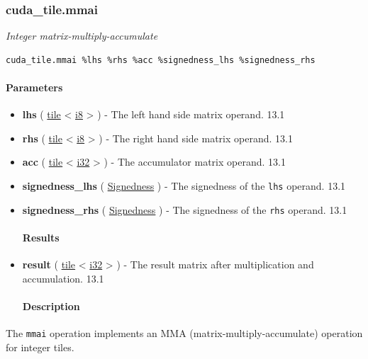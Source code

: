 \documentclass{article}
\begin{document}
\subsubsection{cuda\_tile.mmai}

\textit{Integer matrix-multiply-accumulate}


\begin{lstlisting}
cuda_tile.mmai %lhs %rhs %acc %signedness_lhs %signedness_rhs
\end{lstlisting}

\paragraph{Parameters}

\begin{itemize}
\item \textbf{lhs} ( \href{https://docs.nvidia.com/cuda/tile-ir/latest/sections/types.html#type-tile}{tile} < \href{https://docs.nvidia.com/cuda/tile-ir/latest/sections/types.html#subsection-element-types}{i8} > ) - The left hand side matrix operand. 13.1
\item \textbf{rhs} ( \href{https://docs.nvidia.com/cuda/tile-ir/latest/sections/types.html#type-tile}{tile} < \href{https://docs.nvidia.com/cuda/tile-ir/latest/sections/types.html#subsection-element-types}{i8} > ) - The right hand side matrix operand. 13.1
\item \textbf{acc} ( \href{https://docs.nvidia.com/cuda/tile-ir/latest/sections/types.html#type-tile}{tile} < \href{https://docs.nvidia.com/cuda/tile-ir/latest/sections/types.html#subsection-element-types}{i32} > ) - The accumulator matrix operand. 13.1
\item \textbf{signedness\_lhs} ( \href{https://docs.nvidia.com/cuda/tile-ir/latest/sections/operations.html#op-attribute-cuda-tile-mmai-signedness-attr}{Signedness} ) - The signedness of the \texttt{lhs} operand. 13.1
\item \textbf{signedness\_rhs} ( \href{https://docs.nvidia.com/cuda/tile-ir/latest/sections/operations.html#op-attribute-cuda-tile-mmai-signedness-attr}{Signedness} ) - The signedness of the \texttt{rhs} operand. 13.1


\paragraph{Results}

\item \textbf{result} ( \href{https://docs.nvidia.com/cuda/tile-ir/latest/sections/types.html#type-tile}{tile} < \href{https://docs.nvidia.com/cuda/tile-ir/latest/sections/types.html#subsection-element-types}{i32} > ) - The result matrix after multiplication and accumulation. 13.1


\paragraph{Description}

\end{itemize}
The \texttt{mmai} operation implements an MMA (matrix-multiply-accumulate) operation for integer tiles.
\end{document}
